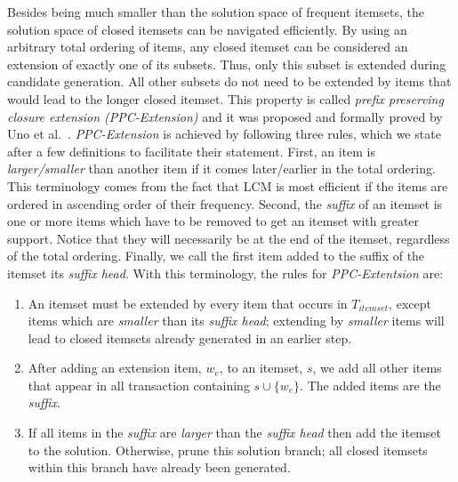 \documentclass{sig-alternate}
\begin{document}
Besides being much smaller than the solution space of frequent itemsets,
the solution space of closed itemsets can be navigated efficiently.
By using an arbitrary total ordering of items, any closed itemset can be
considered an extension of exactly one of its subsets.
Thus, only this subset is extended during candidate generation.
All other subsets do not need to be extended by items that would lead to
the longer closed itemset.
This property is called \emph{prefix preserving closure extension
(PPC-Extension)} and it was proposed and formally proved by
Uno et al.~\cite{uno2004lcm}.
\emph{PPC-Extension} is achieved by following three rules, which we state
after a few definitions to facilitate their statement.
First, an item is \emph{larger/smaller} than another item if it comes
later/earlier in the total ordering.
This terminology comes from the fact that LCM is most efficient if the items
are ordered in ascending order of their frequency.
Second, the \emph{suffix} of an itemset is one or more items 
which have to be removed to get
an itemset with greater support.
Notice that they will necessarily be at the end of the itemset,
regardless of the total ordering.
Finally, we call the first item added to the suffix of the itemset its
\emph{suffix head}.
With this terminology, the rules for \emph{PPC-Extentsion} are:
\begin{enumerate}
\item An itemset must be extended by every item that occurs in $T_{itemset}$, 
except items which are \emph{smaller} than its \emph{suffix head};
extending by \emph{smaller} items will lead to closed itemsets already generated in an earlier step. 
\item After adding an extension item, $w_e$, to an itemset, $s$, we add all other items that appear in all transaction containing $s \cup \{w_e\}$.
The added items are the \emph{suffix}.
\item If all items in the \emph{suffix} are \emph{larger} than the \emph{suffix head} then add the itemset to the solution. Otherwise, prune this solution branch; all closed itemsets within this branch have already been generated. 
\end{enumerate}
 
\end{document}
